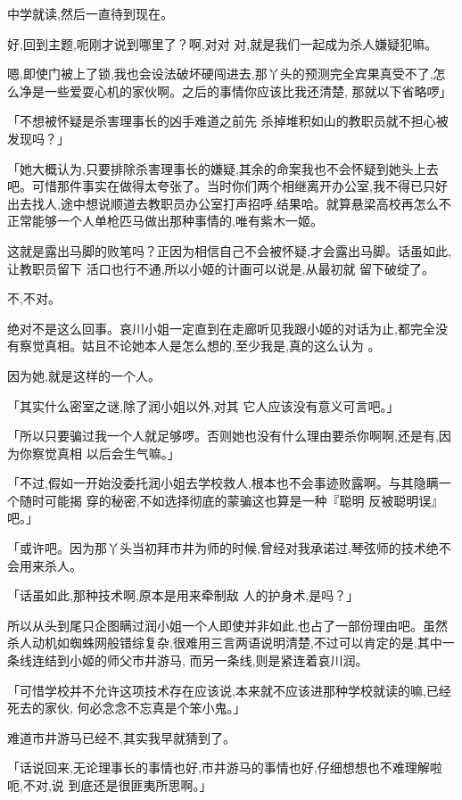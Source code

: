 \documentclass{article}
\begin{document}
\newpage
中学就读,然后一直待到现在。 

好,回到主题,呃刚才说到哪里了？啊,对对
对,就是我们一起成为杀人嫌疑犯嘛。 

嗯,即使门被上了锁,我也会设法破坏硬闯进去,那丫头的预测完全宾果真受不了,怎么净是一些爱耍心机的家伙啊。之后的事情你应该比我还清楚,
那就以下省略啰」 

「不想被怀疑是杀害理事长的凶手难道之前先
杀掉堆积如山的教职员就不担心被发现吗？」 

「她大概认为,只要排除杀害理事长的嫌疑,其余的命案我也不会怀疑到她头上去吧。可惜那件事实在做得太夸张了。当时你们两个相继离开办公室,我不得已只好出去找人,途中想说顺道去教职员办公室打声招呼,结果哈。就算悬梁高校再怎么不正常能够一个人单枪匹马做出那种事情的,唯有紫木一姬。

这就是露出马脚的败笔吗？正因为相信自己不会被怀疑,才会露出马脚。话虽如此,让教职员留下
\newpage
活口也行不通,所以小姬的计画可以说是,从最初就
留下破绽了。 


不,不对。 

绝对不是这么回事。哀川小姐一定直到在走廊听见我跟小姬的对话为止,都完全没有察觉真相。姑且不论她本人是怎么想的,至少我是,真的这么认为
。 


因为她,就是这样的一个人。 

「其实什么密室之谜,除了润小姐以外,对其
它人应该没有意义可言吧。」 

「所以只要骗过我一个人就足够啰。否则她也没有什么理由要杀你啊啊,还是有,因为你察觉真相
以后会生气嘛。」 

「不过,假如一开始没委托润小姐去学校救人,根本也不会事迹败露啊。与其隐瞒一个随时可能揭
\newpage
穿的秘密,不如选择彻底的蒙骗这也算是一种『聪明
反被聪明误』吧。」 

「或许吧。因为那丫头当初拜市井为师的时候,曾经对我承诺过,琴弦师的技术绝不会用来杀人。

「话虽如此,那种技术啊,原本是用来牵制敌
人的护身术,是吗？」 

所以从头到尾只企图瞒过润小姐一个人即使并非如此,也占了一部份理由吧。虽然杀人动机如蜘蛛网般错综复杂,很难用三言两语说明清楚,不过可以肯定的是,其中一条线连结到小姬的师父市井游马,
而另一条线,则是紧连着哀川润。 

「可惜学校并不允许这项技术存在应该说,本来就不应该进那种学校就读的嘛,已经死去的家伙,
何必念念不忘真是个笨小鬼。」 


难道市井游马已经不,其实我早就猜到了。 

\newpage

「话说回来,无论理事长的事情也好,市井游马的事情也好,仔细想想也不难理解啦呃,不对,说
到底还是很匪夷所思啊。」 
\end{document}
